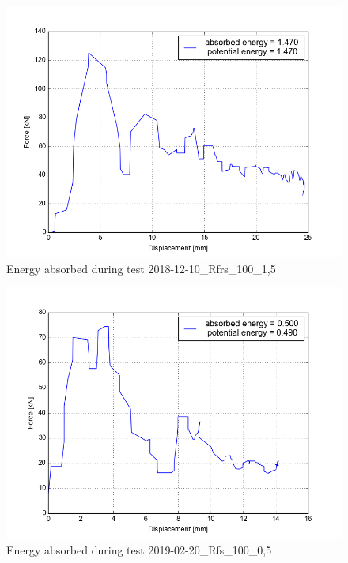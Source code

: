 \begin{figure}
    \centering
    \includegraphics[width=0.95 \linewidth]{pics/2018-12-10_Rfrs_100_1,5_energy.png}
    \caption{Energy absorbed during test 2018-12-10\_Rfrs\_100\_1,5}
    \label{fig:energy2}
\end{figure}

\begin{figure}
    \centering
    \includegraphics[width = 0.95\linewidth]{pics/2019-02-20_Rfrs_75_0,5_energy.png}
    \caption{Energy absorbed during test 2019-02-20\_Rfs\_100\_0,5}
    \label{fig:energy3}
\end{figure}

